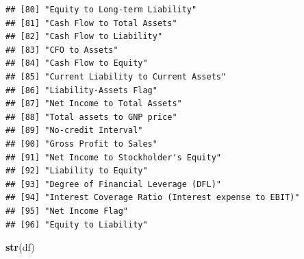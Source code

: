\documentclass[
]{book}
\newenvironment{Shaded}{\begin{snugshade}}{\end{snugshade}}
\newcommand{\FunctionTok}[1]{\textcolor[rgb]{0.13,0.29,0.53}{\textbf{#1}}}
\newcommand{\NormalTok}[1]{#1}
\begin{document}
\begin{verbatim}
## [80] "Equity to Long-term Liability"                          
## [81] "Cash Flow to Total Assets"                              
## [82] "Cash Flow to Liability"                                 
## [83] "CFO to Assets"                                          
## [84] "Cash Flow to Equity"                                    
## [85] "Current Liability to Current Assets"                    
## [86] "Liability-Assets Flag"                                  
## [87] "Net Income to Total Assets"                             
## [88] "Total assets to GNP price"                              
## [89] "No-credit Interval"                                     
## [90] "Gross Profit to Sales"                                  
## [91] "Net Income to Stockholder's Equity"                     
## [92] "Liability to Equity"                                    
## [93] "Degree of Financial Leverage (DFL)"                     
## [94] "Interest Coverage Ratio (Interest expense to EBIT)"     
## [95] "Net Income Flag"                                        
## [96] "Equity to Liability"
\end{verbatim}

\begin{Shaded}
\begin{Highlighting}[]
\FunctionTok{str}\NormalTok{(df)}
\end{Highlighting}
\end{Shaded}
\end{document}
